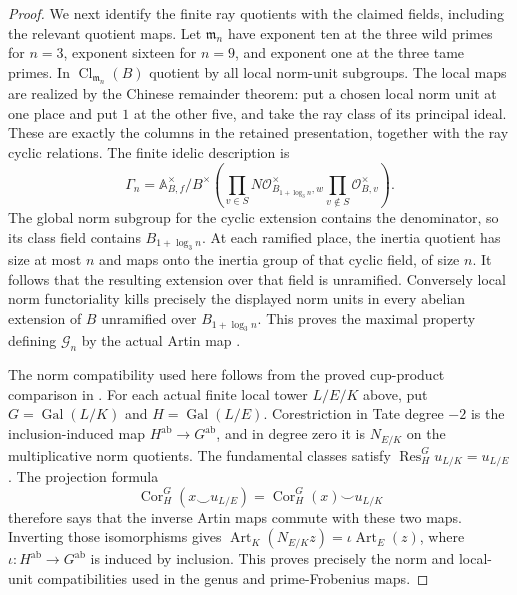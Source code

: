 \begin{proof}
We next identify the finite ray quotients with the
claimed fields, including the relevant quotient
maps. Let $\mathfrak m_n$ have exponent ten at the
three wild primes for $n=3$, exponent sixteen for
$n=9$, and exponent one at the three tame primes.
In $\operatorname{Cl}_{\mathfrak m_n}(B)$ quotient
by all local norm-unit subgroups. The local maps
are realized by the Chinese remainder theorem:
put a chosen local norm unit at one place and
put $1$ at the other five, and take the ray class
of its principal ideal. These are exactly the
columns in the retained presentation, together
with the ray cyclic relations. The finite idelic
description is
\[
 \Gamma_n=\mathbb A_{B,f}^{\times}\big/
 B^\times\left(
 \prod_{v\in S}N\mathcal O_{B_{1+\log_3n},w}^{\times}
 \prod_{v\notin S}\mathcal O_{B,v}^{\times}\right).
 \tag{E76.17}
\]
The global norm subgroup for the cyclic extension
contains the denominator, so its class field
contains $B_{1+\log_3n}$. At each ramified place,
the inertia quotient has size at most $n$ and
maps onto the inertia group of that cyclic field,
of size $n$. It follows that the resulting extension
over that field is unramified. Conversely local
norm functoriality kills precisely the displayed
norm units in every abelian extension of $B$
unramified over $B_{1+\log_3n}$. This proves the
maximal property defining $\mathcal G_n$ by the
actual Artin map
\cite[III, Lemma~3.2; V, Proposition~5.2]{E_MilneCFT}.

The norm compatibility used here follows from the proved
cup-product comparison in \cite[III, Theorem~3.1 and its
restriction/corestriction proof]{E_MilneCFT}.
For each actual finite local tower $L/E/K$ above, put
$G=\operatorname{Gal}(L/K)$ and $H=\operatorname{Gal}(L/E)$.
Corestriction in Tate degree $-2$ is the inclusion-induced map
$H^{\mathrm{ab}}\to G^{\mathrm{ab}}$, and in degree zero
it is $N_{E/K}$ on the multiplicative norm quotients.
The fundamental classes satisfy
$\operatorname{Res}_H^G u_{L/K}=u_{L/E}$.
The projection formula
\[
 \operatorname{Cor}_H^G(x\smile u_{L/E})
   =\operatorname{Cor}_H^G(x)\smile u_{L/K}
\]
therefore says that the inverse Artin maps commute with
these two maps. Inverting those isomorphisms gives
$\operatorname{Art}_K(N_{E/K}z)
 =\iota\operatorname{Art}_E(z)$, where
$\iota:H^{\mathrm{ab}}\to G^{\mathrm{ab}}$ is induced
by inclusion. This proves precisely the norm and local-unit
compatibilities used in the genus and prime-Frobenius maps.


\end{proof}
